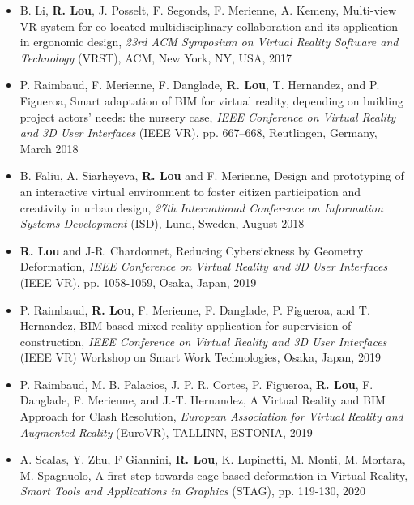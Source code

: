 \documentclass{res}
\begin{document}
\begin{resume}
\begin{itemize}
		\item B. Li, {\bf R. Lou}, J. Posselt, F. Segonds, F. Merienne, A. Kemeny, Multi-view VR system for co-located multidisciplinary collaboration and its application in ergonomic design, {\it  23rd ACM Symposium on Virtual Reality Software and Technology } (VRST),  ACM, New York, NY, USA, 2017
		\item P. Raimbaud, F. Merienne, F. Danglade, {\bf R. Lou}, T. Hernandez, and P. Figueroa, Smart adaptation of BIM for virtual reality, depending on building project actors’ needs: the nursery case, {\it  IEEE Conference on Virtual Reality and 3D User Interfaces} (IEEE VR), pp. 667–668, Reutlingen, Germany, March 2018
		\item B. Faliu, A. Siarheyeva, {\bf R. Lou} and F. Merienne, Design and prototyping of an interactive virtual environment to foster citizen participation and creativity in urban design, {\it  27th International Conference on Information Systems Development } (ISD),  Lund, Sweden, August 2018
		\item {\bf R. Lou} and J-R. Chardonnet, Reducing Cybersickness by Geometry Deformation, {\it  IEEE Conference on Virtual Reality and 3D User Interfaces} (IEEE VR), pp. 1058-1059, Osaka, Japan, 2019
		\item P. Raimbaud, {\bf R. Lou}, F. Merienne, F. Danglade, P. Figueroa, and T. Hernandez, BIM-based mixed reality application for supervision of construction, {\it  IEEE Conference on Virtual Reality and 3D User Interfaces} (IEEE VR) Workshop on Smart Work Technologies, Osaka, Japan, 2019
		\item P. Raimbaud, M. B. Palacios, J. P. R. Cortes, P. Figueroa, {\bf R. Lou}, F. Danglade, F. Merienne, and J.-T. Hernandez, A Virtual Reality and BIM Approach for Clash Resolution, {\it  European Association for Virtual Reality and Augmented Reality} (EuroVR), TALLINN, ESTONIA, 2019
		\item A. Scalas, Y. Zhu, F Giannini, {\bf R. Lou}, K. Lupinetti, M. Monti, M. Mortara, M. Spagnuolo, A first step towards cage-based deformation in Virtual Reality, {\it  Smart Tools and Applications in Graphics} (STAG), pp. 119-130, 2020
		
\end{itemize}


\end{resume}
\end{document}
